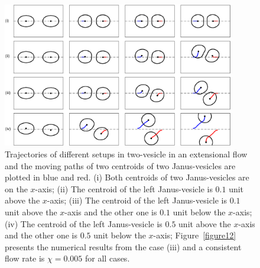 \documentclass[lineno]{jfm}
\begin{document}
\begin{figure}
\begin{center}
\includegraphics[width=0.9\textwidth]{ExtTraj.eps}
\end{center} 
  \caption{Trajectories of different setups in two-vesicle in an extensional flow and the moving paths of two centroids of two Janus-vesicles are plotted in blue and red. (i) Both centroids of two Janus-vesicles are on the $x$-axis; (ii) The centroid of the left Janus-vesicle is $0.1$ unit above the $x$-axis; (iii) 
  The centroid of the left Janus-vesicle is $0.1$ unit above the $x$-axis and the other one is $0.1$ unit below the $x$-axis; (iv) The centroid of the left Janus-vesicle is $0.5$ unit above the $x$-axis and the other one is $0.5$ unit below the $x$-axis; Figure~\ref{figure12} presents the numerical results from the case (iii) and a 
  consistent flow rate is $\chi = 0.005$ for all cases.}
    \label{figure11}
\end{figure}
\end{document}

